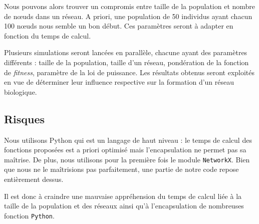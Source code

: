 Nous pouvons alors trouver un compromis entre taille de la population et nombre de nœuds dans un réseau. A priori, une population de 50 individus ayant chacun 100 nœuds nous semble un bon début. Ces paramètres seront à adapter en fonction du temps de calcul.

Plusieurs simulations seront lancées en parallèle, chacune ayant des paramètres différents : taille de la population, taille d'un réseau, pondération de la fonction de \textit{fitness}, paramètre de la loi de puissance. Les résultats obtenus seront exploités en vue de déterminer leur influence respective sur la formation d'un réseau biologique.

\subsection{Risques}
Nous utilisons Python qui est un langage de haut niveau : le temps de calcul des fonctions proposées est a priori optimisé mais l'encapsulation ne permet pas sa maîtrise. De plus, nous utilisons pour la première fois le module \verb?NetworkX?. Bien que nous ne le ma\^itrisions pas parfaitement, une partie de notre code repose entièrement dessus.

Il est donc à craindre une mauvaise appréhension du temps de calcul liée à la taille de la population et des réseaux ainsi qu'à l'encapsulation de nombreuses fonction \verb?Python?.


